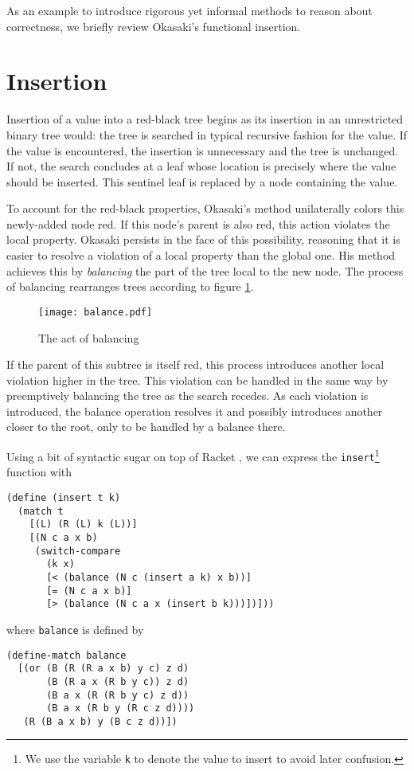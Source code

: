 \documentclass[preprint]{sigplanconf}
\begin{document}
As an example to introduce rigorous yet informal methods to reason about correctness, we briefly review Okasaki's functional insertion.

\section{Insertion}

Insertion of a value into a red-black tree begins as its insertion in an unrestricted binary tree would: the tree is searched in typical recursive fashion for the value. If the value is encountered, the insertion is unnecessary and the tree is unchanged. If not, the search concludes at a leaf whose location is precisely where the value should be inserted. This sentinel leaf is replaced by a node containing the value.

To account for the red-black properties, Okasaki's method unilaterally colors this newly-added node red. If this node's parent is also red, this action violates the local property. Okasaki persists in the face of this possibility, reasoning that it is easier to resolve a violation of a local property than the global one. His method achieves this by \emph{balancing} the part of the tree local to the new node. The process of balancing rearranges trees according to figure \ref{fig:balance}.

\begin{figure}
\label{fig:balance}
\begin{center}
\texttt{[image: balance.pdf]}
\end{center}
\caption{The act of balancing}
\end{figure}

If the parent of this subtree is itself red, this process introduces another local violation higher in the tree. This violation can be handled in the same way by preemptively balancing the tree as the search recedes. As each violation is introduced, the balance operation resolves it and possibly introduces another closer to the root, only to be handled by a balance there. 

Using a bit of syntactic sugar on top of Racket \cite{plt-tr1}, we can express the \texttt{insert}\footnote{We use the variable \texttt{k} to denote the value to insert to avoid later confusion.} function with
\begin{verbatim}
(define (insert t k)
  (match t
    [(L) (R (L) k (L))]
    [(N c a x b)
     (switch-compare
       (k x)
       [< (balance (N c (insert a k) x b))]
       [= (N c a x b)]
       [> (balance (N c a x (insert b k)))])]))
\end{verbatim}
where \texttt{balance} is defined by
\begin{verbatim}
(define-match balance
  [(or (B (R (R a x b) y c) z d)
       (B (R a x (R b y c)) z d)
       (B a x (R (R b y c) z d))
       (B a x (R b y (R c z d))))
   (R (B a x b) y (B c z d))])
\end{verbatim}
\end{document}
